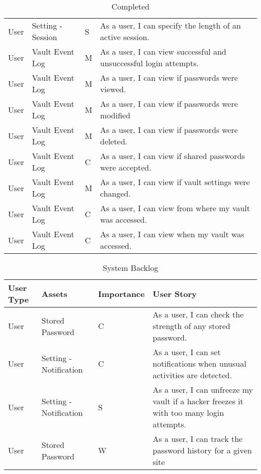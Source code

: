 \documentclass{article}
\begin{document}
\begin{table}[H]
{\begin{tabular}{>{\centering}m{1cm} >{\centering}m{4cm} >{\centering}m{2cm} >{\centering\arraybackslash}m{8cm} }
    User & Setting - Session & S & As a user, I can specify the length of an active session.\\
    User & Vault Event Log & M & As a user, I can view successful and unsuccessful login attempts. \\
    User & Vault Event Log & M & As a user, I can view if passwords were viewed. \\
    User & Vault Event Log & M & As a user, I can view if passwords were modified \\
    User & Vault Event Log & M & As a user, I can view if passwords were deleted. \\
    User & Vault Event Log & C & As a user, I can view if shared passwords were accepted. \\
    User & Vault Event Log & M & As a user, I can view if vault settings were changed. \\
    User & Vault Event Log & C & As a user, I can view from where my vault was accessed. \\
    User & Vault Event Log & C & As a user, I can view when my vault was accessed. \\

    \bottomrule
    \end{tabular}
  }
  \caption{Completed}
  \label{tab:completed}
\end{table}
\newpage

\begin{table}[H]
  \centering
  {
    \renewcommand\arraystretch{1.25}
    \begin{tabular}{>{\centering}m{1cm} >{\centering}m{4cm} >{\centering}m{2cm} >{\centering\arraybackslash}m{8cm} }
    \toprule
    User Type & Assets & Importance & User Story \\
    \midrule
    User & Stored Password & C & As a user, I can check the strength of any stored password. \\
    User & Setting - Notification & C & As a user, I can set notifications when unusual activities are detected. \\
    User & Setting - Notification & S & As a user, I can unfreeze my vault if a hacker freezes it with too many login attempts. \\
    User & Stored Password & W & As a user, I can track the password history for a given site \\
    \bottomrule
    \end{tabular}
  }
  \caption{System Backlog}
  \label{tab:system_backlog}
\end{table}
\end{document}
